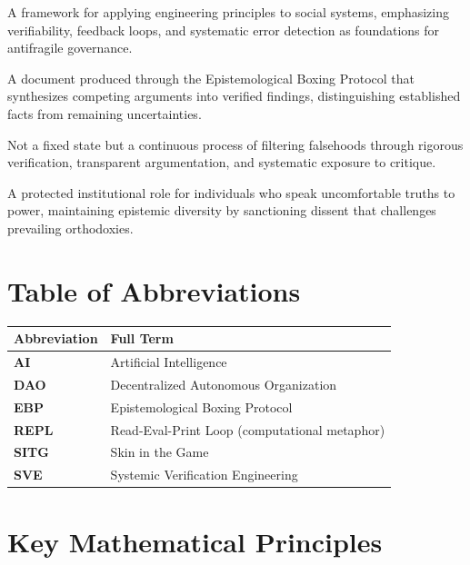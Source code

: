 \documentclass[11pt,a4paper]{article}
\begin{document}
\begin{small}
\begin{description}[style=nextline, leftmargin=0pt, labelindent=0pt, font=\normalfont\bfseries]
    \item[SVE (Systemic Verification Engineering)] A framework for applying engineering principles to social systems, emphasizing verifiability, feedback loops, and systematic error detection as foundations for antifragile governance.
    
    \item[Synthetic Report] A document produced through the Epistemological Boxing Protocol that synthesizes competing arguments into verified findings, distinguishing established facts from remaining uncertainties.
    
    \item[Truth (Operational Definition)] Not a fixed state but a continuous process of filtering falsehoods through rigorous verification, transparent argumentation, and systematic exposure to critique.
    
    \item[Yurodivy (Holy Fool)] A protected institutional role for individuals who speak uncomfortable truths to power, maintaining epistemic diversity by sanctioning dissent that challenges prevailing orthodoxies.
\end{description}

\section*{Table of Abbreviations}

\begin{tabular}{@{}>{\bfseries}ll@{}}
\toprule
\normalfont\textbf{Abbreviation} & \textbf{Full Term} \\
\midrule
AI & Artificial Intelligence \\
DAO & Decentralized Autonomous Organization \\
EBP & Epistemological Boxing Protocol \\
REPL & Read-Eval-Print Loop (computational metaphor) \\
SITG & Skin in the Game \\
SVE & Systemic Verification Engineering \\
\bottomrule
\end{tabular}

\vspace{1cm}

\section*{Key Mathematical Principles}


\end{small}
\end{document}
